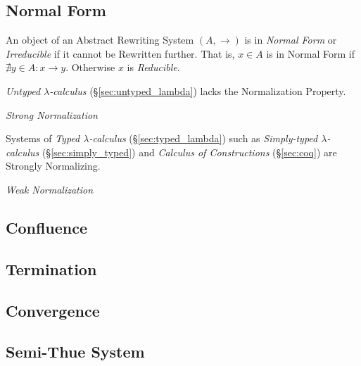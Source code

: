 \subsection{Normal Form}\label{sec:normal_form}

An object of an Abstract Rewriting System $(A,\rightarrow)$ is in
\emph{Normal Form} or \emph{Irreducible} if it cannot be Rewritten
further. That is, $x \in A$ is in Normal Form if $\nexists y \in A : x
\rightarrow y$. Otherwise $x$ is \emph{Reducible}.

\emph{Untyped $\lambda$-calculus} (\S\ref{sec:untyped_lambda}) lacks
the Normalization Property.

\emph{Strong Normalization}

Systems of \emph{Typed $\lambda$-calculus} (\S\ref{sec:typed_lambda})
such as \emph{Simply-typed $\lambda$-calculus}
(\S\ref{sec:simply_typed}) and \emph{Calculus of Constructions}
(\S\ref{sec:coq}) are Strongly Normalizing.

\emph{Weak Normalization}



\subsection{Confluence}\label{sec:rewrite_confluence}

\subsection{Termination}\label{sec:rewrite_termination}

\subsection{Convergence}\label{sec:rewrite_convergence}

\subsection{Semi-Thue System}\label{sec:semithue_system}

